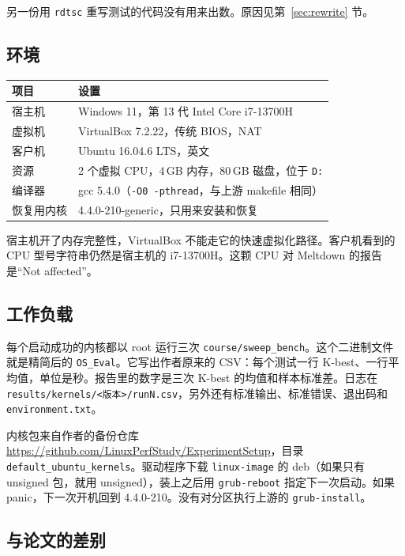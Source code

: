 \documentclass[11pt,fontset=none]{ctexart}
\begin{document}
另一份用 \texttt{rdtsc} 重写测试的代码没有用来出数。原因见第~\ref{sec:rewrite} 节。

\subsection{环境}

\begin{center}
\begin{tabular}{@{}ll@{}}
\toprule
项目 & 设置 \\
\midrule
宿主机 & Windows 11，第 13 代 Intel Core i7-13700H \\
虚拟机 & VirtualBox 7.2.22，传统 BIOS，NAT \\
客户机 & Ubuntu 16.04.6 LTS，英文 \\
资源 & 2 个虚拟 CPU，4\,GB 内存，80\,GB 磁盘，位于 \texttt{D:} \\
编译器 & gcc 5.4.0（\texttt{-O0 -pthread}，与上游 makefile 相同） \\
恢复用内核 & 4.4.0-210-generic，只用来安装和恢复 \\
\bottomrule
\end{tabular}
\end{center}

宿主机开了内存完整性，VirtualBox 不能走它的快速虚拟化路径。客户机看到的 CPU 型号字符串仍然是宿主机的 i7-13700H。这颗 CPU 对 Meltdown 的报告是“Not affected”。

\subsection{工作负载}

每个启动成功的内核都以 root 运行三次 \texttt{course/sweep\_bench}。这个二进制文件就是精简后的 \texttt{OS\_Eval}。它写出作者原来的 CSV：每个测试一行 K-best、一行平均值，单位是秒。报告里的数字是三次 K-best 的均值和样本标准差。日志在 \texttt{results/kernels/<版本>/runN.csv}，另外还有标准输出、标准错误、退出码和 \texttt{environment.txt}。

内核包来自作者的备份仓库 \url{https://github.com/LinuxPerfStudy/ExperimentSetup}，目录 \texttt{default\_ubuntu\_kernels}。驱动程序下载 \texttt{linux-image} 的 deb（如果只有 unsigned 包，就用 unsigned），装上之后用 \texttt{grub-reboot} 指定下一次启动。如果 panic，下一次开机回到 4.4.0-210。没有对分区执行上游的 \texttt{grub-install}。

\subsection{与论文的差别}
\end{document}
